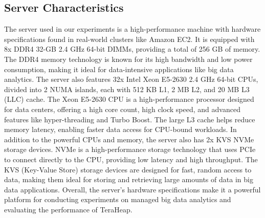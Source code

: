 \subsection{Server Characteristics}
The server used in our experiments is a high-performance machine with
hardware specifications found in real-world clusters like Amazon EC2.
It is equipped with 8x DDR4 32-GB 2.4 GHz 64-bit DIMMs, providing a
total of 256 GB of memory. The DDR4 memory technology is known for its
high bandwidth and low power consumption, making it ideal for
data-intensive applications like big data analytics. The server also
features 32x Intel Xeon E5-2630 2.4 GHz 64-bit CPUs, divided into 2
NUMA islands, each with 512 KB L1, 2 MB L2, and 20 MB L3 (LLC) cache.
The Xeon E5-2630 CPU is a high-performance processor designed for data
centers, offering a high core count, high clock speed, and advanced
features like hyper-threading and Turbo Boost. The large L3 cache
helps reduce memory latency, enabling faster data access for CPU-bound
workloads. In addition to the powerful CPUs and memory, the server
also has 2x KVS NVMe storage devices. NVMe is a high-performance
storage technology that uses PCIe to connect directly to the CPU,
providing low latency and high throughput. The KVS (Key-Value Store)
storage devices are designed for fast, random access to data, making
them ideal for storing and retrieving large amounts of data in big
data applications. Overall, the server's hardware specifications make
it a powerful platform for conducting experiments on managed big data
analytics and evaluating the performance of TeraHeap. 

